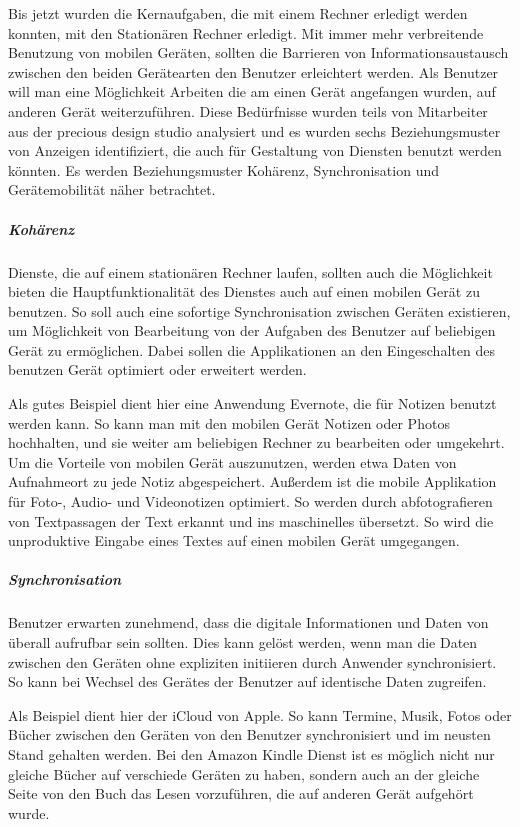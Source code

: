 Bis jetzt wurden die Kernaufgaben, die mit einem Rechner erledigt werden konnten, mit den Stationären Rechner erledigt. Mit immer mehr verbreitende Benutzung von mobilen Geräten, sollten die Barrieren von Informationsaustausch zwischen den beiden Gerätearten den Benutzer erleichtert werden. Als Benutzer will man eine Möglichkeit Arbeiten die am einen Gerät angefangen wurden, auf anderen Gerät weiterzuführen. Diese Bedürfnisse wurden teils von Mitarbeiter aus der precious design studio analysiert und es wurden sechs Beziehungsmuster von Anzeigen identifiziert, die auch für Gestaltung von Diensten benutzt werden könnten\cite{slideEcosystems}. Es werden Beziehungsmuster Kohärenz, Synchronisation und Gerätemobilität näher betrachtet.

\subparagraph{Kohärenz}

Dienste, die auf einem stationären Rechner laufen, sollten auch die Möglichkeit bieten die Hauptfunktionalität des Dienstes auch auf einen mobilen Gerät zu benutzen. So soll auch eine sofortige Synchronisation zwischen Geräten existieren, um Möglichkeit von Bearbeitung von der Aufgaben des Benutzer auf beliebigen Gerät zu ermöglichen. Dabei sollen die Applikationen an den Eingeschalten des benutzen Gerät optimiert oder erweitert werden.

Als gutes Beispiel dient hier eine Anwendung Evernote, die für Notizen benutzt werden kann. So kann man mit den mobilen Gerät Notizen oder Photos hochhalten, und sie weiter am beliebigen Rechner zu bearbeiten oder umgekehrt. Um die Vorteile von mobilen Gerät auszunutzen, werden etwa Daten von Aufnahmeort zu jede Notiz abgespeichert. Außerdem ist die mobile Applikation für Foto-, Audio- und Videonotizen optimiert. So werden durch abfotografieren von Textpassagen der Text erkannt und ins maschinelles übersetzt. So wird die unproduktive Eingabe eines Textes auf einen mobilen Gerät umgegangen.

\subparagraph{Synchronisation}

Benutzer erwarten zunehmend, dass die digitale Informationen und Daten von überall aufrufbar sein sollten. Dies kann gelöst werden, wenn man die Daten zwischen den Geräten ohne expliziten initiieren durch Anwender synchronisiert. So kann bei Wechsel des Gerätes der Benutzer auf identische Daten zugreifen. 

Als Beispiel dient hier der iCloud von Apple. So kann Termine, Musik, Fotos oder Bücher zwischen den Geräten von den Benutzer synchronisiert und im neusten Stand gehalten werden. Bei den Amazon Kindle Dienst ist es möglich nicht nur gleiche Bücher auf verschiede Geräten zu haben, sondern auch an der gleiche Seite von den Buch das Lesen vorzuführen, die auf anderen Gerät aufgehört wurde.

